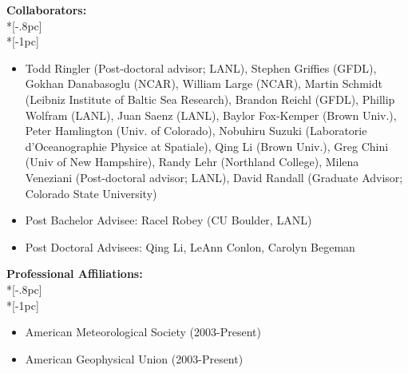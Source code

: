 \documentclass{article}
\begin{document}
\noindent
{\bf Collaborators:}\\*[-.8pc]
\underline{\hspace{6in}} \\*[-1pc]
\begin{itemize}
	\item Todd Ringler (Post-doctoral advisor; LANL), Stephen Griffies (GFDL), Gokhan Danabasoglu (NCAR), William Large (NCAR), Martin Schmidt (Leibniz Institute of Baltic Sea Research), Brandon Reichl (GFDL), Phillip Wolfram (LANL), Juan Saenz (LANL), Baylor Fox-Kemper (Brown Univ.), Peter Hamlington (Univ. of Colorado), Nobuhiru Suzuki (Laboratorie d'Oceanographie Physice at Spatiale), Qing Li (Brown Univ.), Greg Chini (Univ of New Hampshire), Randy Lehr (Northland College), Milena Veneziani (Post-doctoral advisor; LANL), David Randall (Graduate Advisor; Colorado State University)
	\item Post Bachelor Advisee: Racel Robey (CU Boulder, LANL)
	\item Post Doctoral Advisees: Qing Li, LeAnn Conlon, Carolyn Begeman
\end{itemize}
\vskip0.05in

\noindent
{\bf Professional Affiliations:}\\*[-.8pc]
\underline{\hspace{6in}} \\*[-1pc]
\begin{itemize}
	\item American Meteorological Society (2003-Present)
	\item American Geophysical Union (2003-Present)
\end{itemize}
\vskip0.05in
\end{document}
